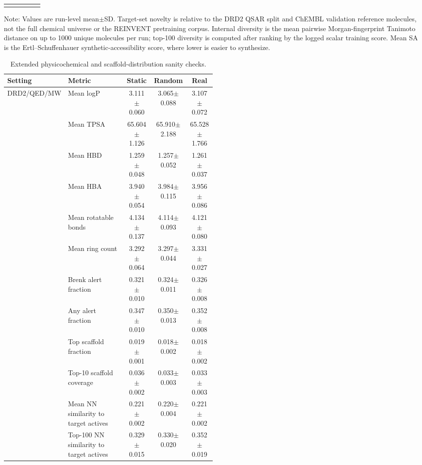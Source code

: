 \begin{table}[!t]
\begin{tabularx}{\linewidth}{@{}p{0.22\linewidth}p{0.22\linewidth}ccc@{}}
\addlinespace
\botrule
\end{tabularx}
\vspace{2pt}
\raggedright
\footnotesize
Note: Values are run-level mean$\pm$SD. Target-set novelty is relative to the DRD2 QSAR split and ChEMBL validation reference molecules, not the full chemical universe or the REINVENT pretraining corpus. Internal diversity is the mean pairwise Morgan-fingerprint Tanimoto distance on up to 1000 unique molecules per run; top-100 diversity is computed after ranking by the logged scalar training score. Mean SA is the Ertl--Schuffenhauer synthetic-accessibility score, where lower is easier to synthesize.
\end{table}

\begin{table}[!t]
\caption{Extended physicochemical and scaffold-distribution sanity checks.}
\label{tab:molecule_quality_extended}
\centering
\footnotesize
\setlength{\tabcolsep}{3pt}
\begin{tabularx}{\linewidth}{@{}p{0.22\linewidth}p{0.28\linewidth}ccc@{}}
\toprule
Setting & Metric & Static & Random & Real\\
\midrule
DRD2/QED/MW & Mean logP & 3.111$\pm$0.060 & 3.065$\pm$0.088 & 3.107$\pm$0.072\\
 & Mean TPSA & 65.604$\pm$1.126 & 65.910$\pm$2.188 & 65.528$\pm$1.766\\
 & Mean HBD & 1.259$\pm$0.048 & 1.257$\pm$0.052 & 1.261$\pm$0.037\\
 & Mean HBA & 3.940$\pm$0.054 & 3.984$\pm$0.115 & 3.956$\pm$0.086\\
 & Mean rotatable bonds & 4.134$\pm$0.137 & 4.114$\pm$0.093 & 4.121$\pm$0.080\\
 & Mean ring count & 3.292$\pm$0.064 & 3.297$\pm$0.044 & 3.331$\pm$0.027\\
 & Brenk alert fraction & 0.321$\pm$0.010 & 0.324$\pm$0.011 & 0.326$\pm$0.008\\
 & Any alert fraction & 0.347$\pm$0.010 & 0.350$\pm$0.013 & 0.352$\pm$0.008\\
 & Top scaffold fraction & 0.019$\pm$0.001 & 0.018$\pm$0.002 & 0.018$\pm$0.002\\
 & Top-10 scaffold coverage & 0.036$\pm$0.002 & 0.033$\pm$0.003 & 0.033$\pm$0.003\\
 & Mean NN similarity to target actives & 0.221$\pm$0.002 & 0.220$\pm$0.004 & 0.221$\pm$0.002\\
 & Top-100 NN similarity to target actives & 0.329$\pm$0.015 & 0.330$\pm$0.020 & 0.352$\pm$0.019\\

\end{tabularx}
\end{table}
